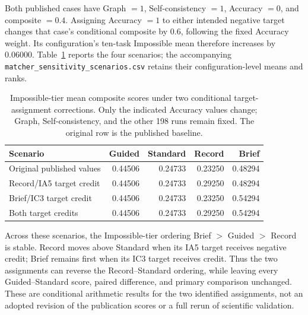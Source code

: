 Both published cases have Graph $=1$, Self-consistency $=1$, Accuracy $=0$, and composite $=0.4$. Assigning Accuracy $=1$ to either intended negative target changes that case's conditional composite by $0.6$, following the fixed Accuracy weight. Its configuration's ten-task Impossible mean therefore increases by $0.06000$. Table~\ref{tab:matcher-sensitivity} reports the four scenarios; the accompanying \texttt{matcher\_sensitivity\_scenarios.csv} retains their configuration-level means and ranks.

\begin{table}[htbp]
\centering
\small
\caption{Impossible-tier mean composite scores under two conditional target-assignment corrections. Only the indicated Accuracy values change; Graph, Self-consistency, and the other 198 runs remain fixed. The original row is the published baseline.}
\label{tab:matcher-sensitivity}
\begin{tabular}{@{}lrrrr@{}}
\toprule
Scenario & Guided & Standard & Record & Brief \\
\midrule
Original published values & 0.44506 & 0.24733 & 0.23250 & 0.48294 \\
Record/IA5 target credit & 0.44506 & 0.24733 & 0.29250 & 0.48294 \\
Brief/IC3 target credit & 0.44506 & 0.24733 & 0.23250 & 0.54294 \\
Both target credits & 0.44506 & 0.24733 & 0.29250 & 0.54294 \\
\bottomrule
\end{tabular}
\end{table}

Across these scenarios, the Impossible-tier ordering Brief $>$ Guided $>$ Record is stable. Record moves above Standard when its IA5 target receives negative credit; Brief remains first when its IC3 target receives credit. Thus the two assignments can reverse the Record--Standard ordering, while leaving every Guided--Standard score, paired difference, and primary comparison unchanged. These are conditional arithmetic results for the two identified assignments, not an adopted revision of the publication scores or a full rerun of scientific validation.
